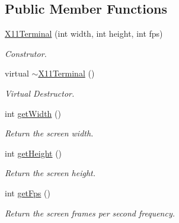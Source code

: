 \subsection*{Public Member Functions}
\begin{DoxyCompactItemize}
\item 
\hyperlink{classbr_1_1ufscar_1_1lince_1_1xpta_1_1streaming_1_1X11Terminal_a7110a4bae4314923d06f0717b6700ba3}{X11Terminal} (int width, int height, int fps)
\begin{DoxyCompactList}\small\item\em Construtor. \item\end{DoxyCompactList}\item 
virtual \hyperlink{classbr_1_1ufscar_1_1lince_1_1xpta_1_1streaming_1_1X11Terminal_aa16b9c8205c9805186b6b9842e663be8}{$\sim$X11Terminal} ()
\begin{DoxyCompactList}\small\item\em Virtual Destructor. \item\end{DoxyCompactList}\item 
int \hyperlink{classbr_1_1ufscar_1_1lince_1_1xpta_1_1streaming_1_1X11Terminal_aa5fd1bf532e03b039849220fa99e1503}{getWidth} ()
\begin{DoxyCompactList}\small\item\em Return the screen width. \item\end{DoxyCompactList}\item 
int \hyperlink{classbr_1_1ufscar_1_1lince_1_1xpta_1_1streaming_1_1X11Terminal_a343d98ed7a5ce3da708e7ae027197abe}{getHeight} ()
\begin{DoxyCompactList}\small\item\em Return the screen height. \item\end{DoxyCompactList}\item 
int \hyperlink{classbr_1_1ufscar_1_1lince_1_1xpta_1_1streaming_1_1X11Terminal_afe951939b484e65bad24b52e4c9bbb52}{getFps} ()
\begin{DoxyCompactList}\small\item\em Return the screen frames per second frequency. \item\end{DoxyCompactList}\end{DoxyCompactItemize}
